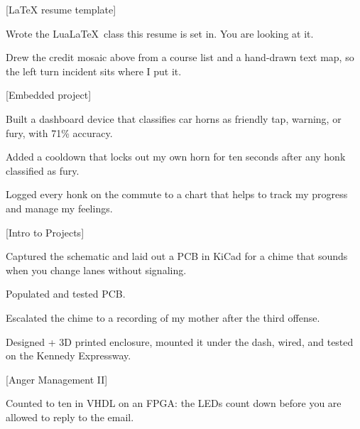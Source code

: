 \documentclass[palette=walnut]{mosaicresume}
\begin{document}
\begin{threecolumns}
\nextcolumn
{}
[{\LaTeX} resume template]
\begin{rbullets}
  \item Wrote the Lua\LaTeX\ class this resume is set in. You are looking at it.
  \item Drew the credit mosaic above from a course list and a hand-drawn text map, so the left turn incident sits where I put it.
\end{rbullets}
\gapafter
{}[Embedded project]
\begin{rbullets}
  \item Built a dashboard device that classifies car horns as friendly tap, warning, or fury, with 71\% accuracy.
  \item Added a cooldown that locks out my own horn for ten seconds after any honk classified as fury.
  \item Logged every honk on the commute to a chart that helps to track my progress and manage my feelings.
\end{rbullets}
\gapafter
{}[Intro to Projects]
\begin{rbullets}
  \item Captured the schematic and laid out a PCB in KiCad for a chime that sounds when you change lanes without signaling.
  \item Populated and tested PCB.
  \item Escalated the chime to a recording of my mother after the third offense.
  \item Designed + 3D printed enclosure, mounted it under the dash, wired, and tested on the Kennedy Expressway.
\end{rbullets}
\gapafter
{}[Anger Management II]
\begin{rbullets}
  \item Counted to ten in VHDL on an FPGA: the LEDs count down before you are allowed to reply to the email.
\end{rbullets}


\end{threecolumns}
\end{document}

